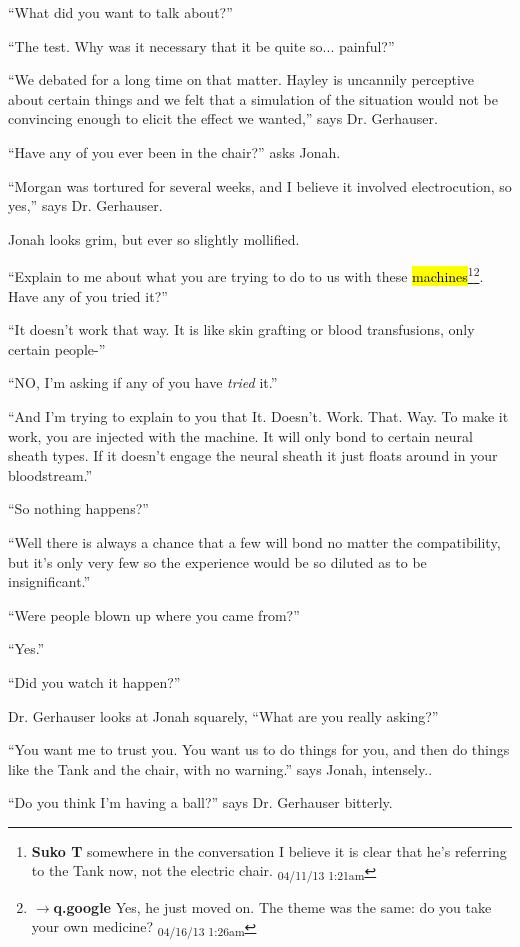 ``What did you want to talk about?''

``The test. Why was it necessary that it be quite so... painful?''

``We debated for a long time on that matter.  Hayley is uncannily perceptive about certain things and we felt that a simulation of the situation would not be convincing enough to elicit the effect we wanted,'' says Dr. Gerhauser.

``Have any of you ever been in the chair?'' asks Jonah.

``Morgan was tortured for several weeks, and I believe it involved electrocution, so yes,'' says Dr. Gerhauser.

Jonah looks grim, but ever so slightly mollified.

``Explain to me about what you are trying to do to us with these \hl{machines}\footnote{\textbf{Suko T }somewhere in the conversation I believe it is clear that he's referring to the Tank now, not the electric chair. \textsubscript{04/11/13 1:21am}}\footnote{$\rightarrow$\textbf{q.google }Yes, he just moved on.  The theme was the same: do you take your own medicine? \textsubscript{04/16/13 1:26am}}. Have any of you tried it?''

``It doesn't work that way.  It is like skin grafting or blood transfusions, only certain people-''

``NO, I'm asking if any of you have \textit{tried} it.''

``And I'm trying to explain to you that It. Doesn't. Work. That. Way.  To make it work, you are injected with the machine.  It will only bond to certain neural sheath types.  If it doesn't engage the neural sheath it just floats around in your bloodstream.''

``So nothing happens?''

``Well there is always a chance that a few will bond no matter the compatibility, but it's only very few so the experience would be so diluted as to be insignificant.''

``Were people blown up where you came from?''

``Yes.''

``Did you watch it happen?''

Dr. Gerhauser looks at Jonah squarely, ``What are you really asking?''

``You want me to trust you.  You want us to do things for you, and then do things like the Tank and the chair, with no warning.'' says Jonah, intensely..

``Do you think I'm having a ball?'' says Dr. Gerhauser bitterly.

